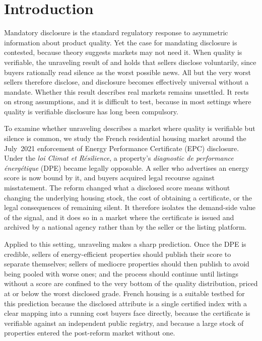 
\section{Introduction}
\label{sec:intro}

Mandatory disclosure is the standard regulatory response to asymmetric information about
product quality. Yet the case for mandating disclosure is contested, because theory suggests
markets may not need it. When quality is verifiable, the unraveling result of
\citet{grossman_informational_1981} and \citet{milgrom_good_1981} holds that sellers disclose
voluntarily, since buyers rationally read silence as the worst possible news. All but the very
worst sellers therefore disclose, and disclosure becomes effectively universal without a
mandate. Whether this result describes real markets remains unsettled. It rests on strong
assumptions, and it is difficult to test, because in most settings where quality is verifiable
disclosure has long been compulsory.

To examine whether unraveling describes a market where quality is verifiable but silence is
common, we study the French residential housing market around the July~2021 enforcement of
Energy Performance Certificate (EPC) disclosure. Under the \emph{loi Climat et
R\'esilience}, a property's \emph{diagnostic de performance \'energ\'etique} (DPE) became
legally opposable. A seller who advertises an energy score is now bound by it, and buyers acquired
legal recourse against misstatement. The reform changed what a disclosed score means without
changing the underlying housing stock, the cost of obtaining a certificate, or the legal
consequences of remaining silent. It therefore isolates the demand-side value of the signal, and
it does so in a market where the certificate is issued and archived by a national agency rather
than by the seller or the listing platform.

Applied to this setting, unraveling makes a sharp prediction. Once the DPE is credible, sellers
of energy-efficient properties should publish their score to separate themselves; sellers of
mediocre properties should then publish to avoid being pooled with worse ones; and the process
should continue until listings without a score are confined to the very bottom of the quality
distribution, priced at or below the worst disclosed grade. French housing is a suitable
testbed for this prediction because the disclosed attribute is a single certified index with a
clear mapping into a running cost buyers face directly, because the certificate is verifiable
against an independent public registry, and because a large stock of properties entered the
post-reform market without one.

